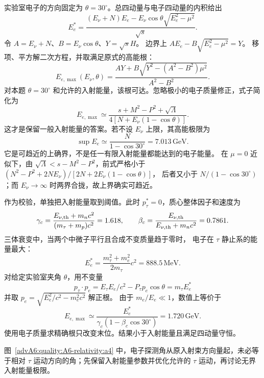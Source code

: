 \begin{advsolution}
实验室电子的方向固定为 $\theta=30^\circ$。总四动量与电子四动量的内积给出
\[
 E_e^*=\frac{(E_\nu+N)E_e-E_\nu\cos\theta\sqrt{E_e^2-\mu^2}}{\sqrt s}.
\]
令 $A=E_\nu+N$、$B=E_\nu\cos\theta$、$Y=\sqrt s H$。
边界上 $AE_e-B\sqrt{E_e^2-\mu^2}=Y$。
移项、平方解二次方程，并取满足原式的高能根：
\[
 \boxed{E_{e,\max}(E_\nu,\theta)=
 \frac{AY+B\sqrt{Y^2-(A^2-B^2)\mu^2}}{A^2-B^2}}.
\]
对本题 $\theta=30^\circ$ 和允许的入射能量，该根可达。忽略极小的电子质量修正，式子简化为
\[
 \boxed{E_{e,\max}\simeq
 \frac{s+M^2-P^2+\sqrt\Lambda}
 {4[N+E_\nu(1-\cos\theta)]}}.
\]
这才是保留一般入射能量的答案。若不设 $E_\nu$ 上限，其高能极限为
\[
 \sup E_e\simeq\frac{N}{1-\cos30^\circ}=7.013\,\mathrm{GeV}.
\]
它是可趋近的上确界，不是任一有限入射能量都能达到的电子能量。
在 $\mu=0$ 近似下，由 $\sqrt\Lambda<s-M^2-P^2$，前式严格小于
$(N^2-P^2+2NE_\nu)/[2N+2E_\nu(1-\cos\theta)]$，
后者又小于 $N/(1-\cos30^\circ)$；而 $E_\nu\to\infty$ 时两界合拢，故上界确实可趋近。

作为校验，单独把入射能量取到阈值。此时 $p_\tau^*=0$，质心整体因子和速度为
\[
 \gamma_c=\frac{E_{\nu,\rm th}+m_nc^2}
 {(m_\tau+m_p)c^2}=1.618,\qquad
 \beta_c=\frac{E_{\nu,\rm th}}
 {E_{\nu,\rm th}+m_nc^2}=0.7861.
\]
三体衰变中，当两个中微子平行且合成不变质量趋于零时，
电子在 $\tau$ 静止系的能量最大：
\[
 E_e^*=\frac{m_\tau^2+m_e^2}{2m_\tau}c^2
 =888.5\,\mathrm{MeV}.
\]
对给定实验室夹角 $\theta$，用不变量
\[
 p_\tau\cdot p_e
 =E_\tau E_e/c^2-P_\tau p_e\cos\theta
 =m_\tau E_e^*
\]
并取 $p_e=\sqrt{E_e^2/c^2-m_e^2c^2}$ 解正根。
由于 $m_e/E_e\ll1$，数值上等价于
\[
 E_{e,\max}\simeq
 \frac{E_e^*}{\gamma_c(1-\beta_c\cos30^\circ)}
 =\boxed{1.720\,\mathrm{GeV}}.
\]
使用电子质量求精确根只改变末位。结果小于入射能量且满足四动量守恒。

图~\ref{advA6:quality:A6-relativity:a4} 中，电子探测角从原入射束方向量起，未必等于相对 $\tau$ 运动方向的角；先保留入射能量参数并优化允许的 $\tau$ 运动，再讨论无界入射能量极限。
\end{advsolution}
